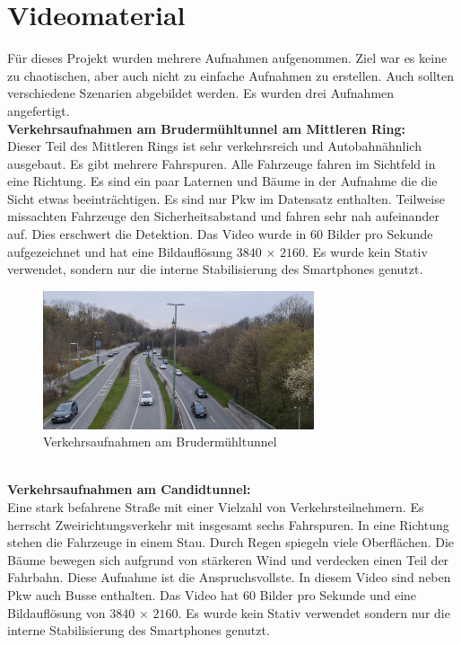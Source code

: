 \documentclass[conference]{IEEEtran}
\begin{document}
	\section{Videomaterial}
	Für dieses Projekt wurden mehrere Aufnahmen aufgenommen. Ziel war es keine zu chaotischen, aber auch nicht zu einfache Aufnahmen zu erstellen. Auch sollten verschiedene Szenarien abgebildet werden. Es wurden drei Aufnahmen angefertigt.\\
	\textbf{Verkehrsaufnahmen am Brudermühltunnel am Mittleren Ring:}\\
	Dieser Teil des Mittleren Rings ist sehr verkehrsreich und Autobahnähnlich ausgebaut. Es gibt mehrere Fahrspuren. Alle Fahrzeuge fahren im Sichtfeld in eine Richtung. Es sind ein paar Laternen und Bäume in der Aufnahme die die Sicht etwas beeinträchtigen. Es sind nur Pkw im Datensatz enthalten. Teilweise missachten Fahrzeuge den Sicherheitsabstand und fahren sehr nah aufeinander auf. Dies erschwert die Detektion. Das Video wurde in 60 Bilder pro Sekunde aufgezeichnet und hat eine Bildauflösung $3840$ × $2160$. Es wurde kein Stativ verwendet, sondern nur die interne Stabilisierung des Smartphones genutzt.
	\begin{figure}[!h]
		\begin{center}
			\includegraphics[width=8cm]{Media/BrudermuhlRaw.png}
			\caption{Verkehrsaufnahmen am Brudermühltunnel}
			\label{BrudermuhlRaw}
		\end{center}
	\end{figure}\\
	\textbf{Verkehrsaufnahmen am Candidtunnel:}\\
	Eine stark befahrene Straße mit einer Vielzahl von Verkehrsteilnehmern. Es herrscht Zweirichtungsverkehr mit insgesamt sechs Fahrspuren. In eine Richtung stehen die Fahrzeuge in einem Stau. Durch Regen spiegeln viele Oberflächen. Die Bäume bewegen sich aufgrund von stärkeren Wind und verdecken einen Teil der Fahrbahn. Diese Aufnahme ist die Anspruchsvollste. In diesem Video sind neben Pkw auch Busse enthalten. Das Video hat 60 Bilder pro Sekunde und eine Bildauflösung von $3840$ × $2160$. Es wurde kein Stativ verwendet sondern nur die interne Stabilisierung des Smartphones genutzt.
\end{document}
